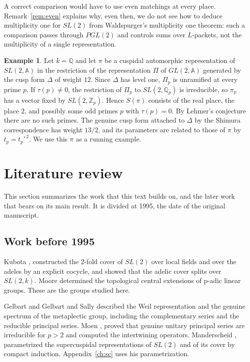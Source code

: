 \documentclass[12pt,letterpaper,openany]{book}
\theoremstyle{plain}
\theoremstyle{definition}
\newtheorem{example}[theorem]{Example}
\theoremstyle{remark}
\theoremstyle{remark}
\begin{document}
A correct comparison would have to use even matchings at every place.
Remark~\ref{rem:even} explains why, even then, we do not see how to deduce
multiplicity one for $SL(2)$ from Waldspurger's multiplicity one theorem:
such a comparison passes through $PGL(2)$ and controls sums over
$L$-packets, not the multiplicity of a single representation.

\begin{example}
Let $k={\mathbb Q}$ and let $\pi$ be a cuspidal automorphic representation of
$SL(2,{\mathbb A})$ in the restriction of the representation $\Pi$ of
$GL(2,{\mathbb A})$ generated by the cusp form $\Delta$ of weight $12$. Since
$\Delta$ has level one, $\Pi_p$ is unramified at every prime $p$. If
$\tau(p)\neq0$, the restriction of $\Pi_p$ to $SL(2,{\mathbb Q}_p)$ is
irreducible, so $\pi_p$ has a vector fixed by $SL(2,{\mathbb Z}_p)$. Hence
$S(\pi)$ consists of the real place, the place $2$, and possibly some odd
primes $p$ with $\tau(p)=0$. By Lehmer's conjecture there are no such
primes. The genuine cusp form attached to $\Delta$ by the Shimura
correspondence has weight $13/2$, and its parameters are related to those
of $\pi$ by $t_p=t_p'^{\,2}$. We use this $\pi$ as a running example.
\end{example}

\section{Literature review}\label{sec:litreview}

This section summarizes the work that this text builds on, and the later
work that bears on its main result. It is divided at 1995, the date of the
original manuscript.

\subsection*{Work before 1995}

Kubota \cite{K1}, \cite{K2} constructed the 2-fold cover of $SL(2)$ over
local fields and over the adeles by an explicit cocycle, and showed that
the adelic cover splits over $SL(2,k)$. Moore \cite{M} determined the
topological central extensions of p-adic linear groups. These are the
groups studied here.

Gelbart \cite{Ge2} and Gelbart and Sally \cite{GS} described the Weil
representation and the genuine spectrum of the metaplectic group,
including the complementary series and the reducible principal series.
Moen \cite{Mo1}, \cite{Mo2} proved that genuine unitary principal series
are irreducible for $p>2$ and computed the intertwining operators.
Manderscheid \cite{M1}, \cite{M2} parametrized the supercuspidal
representations of $SL(2)$ and of its cover by compact induction. Appendix~\ref{ch:sc}
uses his parametrization.
\end{document}
